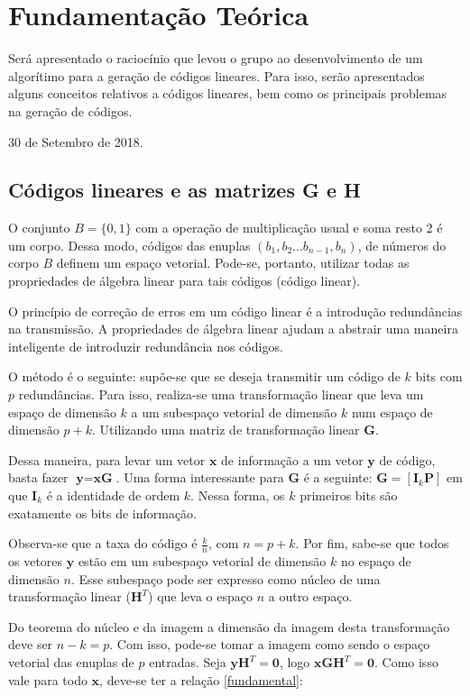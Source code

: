 \section{Fundamentação Teórica}
Será apresentado o raciocínio que levou o grupo ao desenvolvimento de um algorítimo para a geração de códigos lineares. Para isso, serão apresentados alguns conceitos relativos a códigos lineares, bem como os principais problemas na geração de códigos.
 
\hfill 30 de Setembro de 2018.

\subsection{Códigos lineares e as matrizes G e H}
O conjunto $\textit{B} = \{0, 1\}$ com a operação de multiplicação usual e soma resto 2 é um corpo. Dessa modo, códigos das enuplas $(b_1, b_2 ...b_{n-1}, b_n)$, de números do corpo $\textit{B}$ definem um espaço vetorial. Pode-se, portanto, utilizar todas as propriedades de álgebra linear para tais códigos (código linear).

O princípio de correção de erros em um código linear é a introdução redundâncias na transmissão. A propriedades de álgebra linear ajudam a abstrair uma maneira inteligente de introduzir redundância nos códigos.

O método é o seguinte: supõe-se que se deseja transmitir um código de $k$ bits com $p$ redundâncias. Para isso, realiza-se uma transformação linear que leva um espaço de dimensão $k$ a um subespaço vetorial de dimensão $k$ num espaço de dimensão $p+k$. Utilizando uma matriz de transformação linear $\textbf{G}$.

Dessa maneira, para levar um vetor $\textbf{x}$ de informação a um vetor $\textbf{y}$ de código, basta fazer $\textbf{y} = \textbf{x}\textbf{G}$. Uma forma interessante para $\textbf{G}$ é a seguinte: $\textbf{G} = [\textbf{I}_k \textbf{P}]$ em que $\textbf{I}_k$ é a identidade de ordem $k$. Nessa forma, os $k$ primeiros bits são exatamente os bits de informação.

Observa-se que a taxa do código é $\frac{k}{n}$, com $n = p+k$. Por fim, sabe-se que todos os vetores $\textbf{y}$ estão em um subespaço vetorial de dimensão $k$ no espaço de dimensão $n$. Esse subespaço pode ser expresso como núcleo de uma transformação linear ($\textbf{H}^T$) que leva o espaço $n$ a outro espaço.

Do teorema do núcleo e da imagem a dimensão da imagem desta transformação deve ser $n-k = p$. Com isso, pode-se tomar a imagem como sendo o espaço vetorial das enuplas de $p$ entradas. Seja $\textbf{y}\textbf{H}^T =\textbf{0}$, logo $\textbf{x}\textbf{G}\textbf{H}^T =\textbf{0}$. Como isso vale para todo $\textbf{x}$, deve-se ter a relação \ref{fundamental}:

